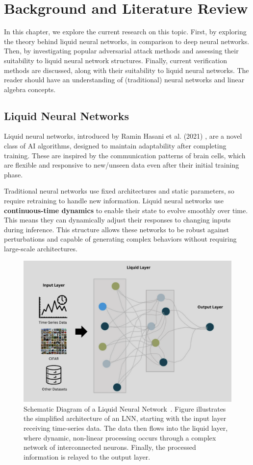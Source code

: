 \chapter{Background and Literature Review}
In this chapter, we explore the current research on this topic. First, by exploring the theory behind liquid neural networks, in comparison to deep neural networks. Then, by investigating popular adversarial attack methods and assessing their suitability to liquid neural network structures. Finally, current verification methods are discussed, along with their suitability to liquid neural networks. The reader should have an understanding of (traditional) neural networks and linear algebra concepts.

\section{Liquid Neural Networks}

Liquid neural networks, introduced by Ramin Hasani et al. (2021) \cite{hasaniLiquidTimeconstantNetworks2021}, are a novel class of AI algorithms, designed to maintain adaptability after completing training. These are inspired by the communication patterns of brain cells, which are flexible and responsive to new/unseen data even after their initial training phase.

Traditional neural networks use fixed architectures and static parameters, so require retraining to handle new information. Liquid neural networks use \textbf{continuous-time dynamics} to enable their state to evolve smoothly over time. This means they can dynamically adjust their responses to changing inputs during inference. This structure allows these networks to be robust against perturbations and capable of generating complex behaviors without requiring large-scale architectures.

\begin{figure}[H]
    \centering
    \includegraphics[width=0.7\linewidth]{img/lnn_overview.png}
    \caption{
    Schematic Diagram of a Liquid Neural Network~\cite{frank2024learning}. Figure illustrates the simplified architecture of an LNN, starting with the input layer receiving time-series data. The data then flows into the liquid layer, where dynamic, non-linear processing occurs through a complex network of interconnected neurons. Finally, the processed information is relayed to the output layer.
    }
    \label{fig:lnn_overview}
\end{figure}

